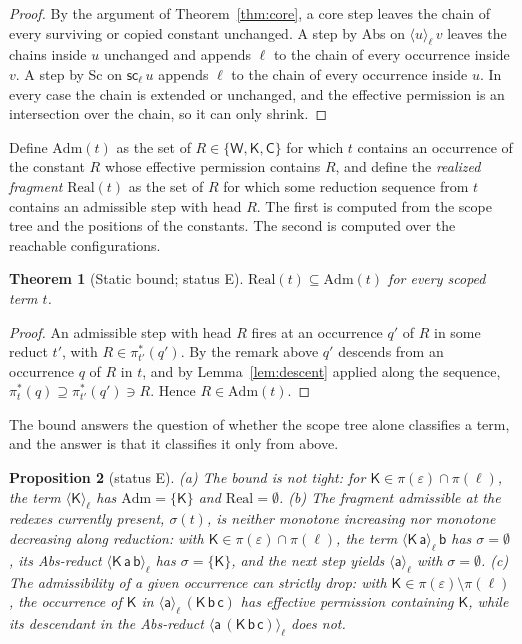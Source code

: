 \documentclass[11pt]{article}
\newtheorem{theorem}{Theorem}[section]
\newtheorem{proposition}[theorem]{Proposition}
\theoremstyle{definition}
\theoremstyle{remark}
\newcommand{\cC}{\mathsf{C}}
\newcommand{\cK}{\mathsf{K}}
\newcommand{\cW}{\mathsf{W}}
\newcommand{\br}[2]{\langle #1\rangle_{#2}}
\newcommand{\sca}[1]{\mathsf{sc}_{#1}}
\newcommand{\Adm}{\mathrm{Adm}}
\newcommand{\Real}{\mathrm{Real}}
\newcommand{\Et}{status E}
\begin{document}
\begin{proof}
By the argument of Theorem~\ref{thm:core}, a core step leaves the chain of every surviving or copied constant unchanged. A step by Abs on $\br u\ell\,v$ leaves the chains inside $u$ unchanged and appends $\ell$ to the chain of every occurrence inside $v$. A step by Sc on $\sca\ell\,u$ appends $\ell$ to the chain of every occurrence inside $u$. In every case the chain is extended or unchanged, and the effective permission is an intersection over the chain, so it can only shrink.
\end{proof}

Define $\Adm(t)$ as the set of $R\in\{\cW,\cK,\cC\}$ for which $t$ contains an occurrence of the constant $R$ whose effective permission contains $R$, and define the \emph{realized fragment} $\Real(t)$ as the set of $R$ for which some reduction sequence from $t$ contains an admissible step with head $R$. The first is computed from the scope tree and the positions of the constants. The second is computed over the reachable configurations.

\begin{theorem}[Static bound; \Et]\label{thm:bound}
$\Real(t)\subseteq\Adm(t)$ for every scoped term $t$.
\end{theorem}

\begin{proof}
An admissible step with head $R$ fires at an occurrence $q'$ of $R$ in some reduct $t'$, with $R\in\pi^\ast_{t'}(q')$. By the remark above $q'$ descends from an occurrence $q$ of $R$ in $t$, and by Lemma~\ref{lem:descent} applied along the sequence, $\pi^\ast_t(q)\supseteq\pi^\ast_{t'}(q')\ni R$. Hence $R\in\Adm(t)$.
\end{proof}

The bound answers the question of whether the scope tree alone classifies a term, and the answer is that it classifies it only from above.

\begin{proposition}[\Et]\label{prop:notmonotone}
(a) The bound is not tight: for $\cK\in\pi(\varepsilon)\cap\pi(\ell)$, the term $\br{\cK}\ell$ has $\Adm=\{\cK\}$ and $\Real=\emptyset$. (b) The fragment admissible at the redexes currently present, $\sigma(t)$, is neither monotone increasing nor monotone decreasing along reduction: with $\cK\in\pi(\varepsilon)\cap\pi(\ell)$, the term $\br{\cK\,\mathsf a}\ell\,\mathsf b$ has $\sigma=\emptyset$, its Abs-reduct $\br{\cK\,\mathsf a\,\mathsf b}\ell$ has $\sigma=\{\cK\}$, and the next step yields $\br{\mathsf a}\ell$ with $\sigma=\emptyset$. (c) The admissibility of a given occurrence can strictly drop: with $\cK\in\pi(\varepsilon)\setminus\pi(\ell)$, the occurrence of $\cK$ in $\br{\mathsf a}\ell\,(\cK\,\mathsf b\,\mathsf c)$ has effective permission containing $\cK$, while its descendant in the Abs-reduct $\br{\mathsf a\,(\cK\,\mathsf b\,\mathsf c)}\ell$ does not.
\end{proposition}
\end{document}

